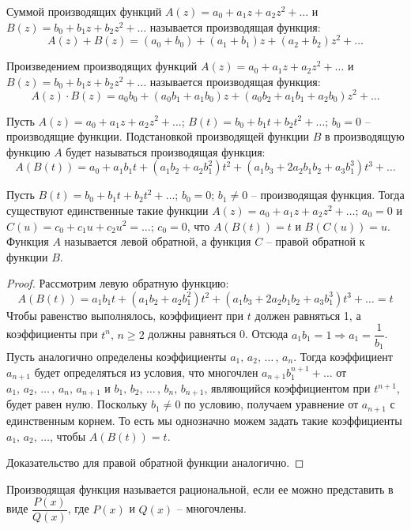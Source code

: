 \documentclass[12pt]{article}
\begin{document}
\begin{definition}
    Суммой производящих функций $A(z)=a_0+a_1z+a_2z^2+\ldots$ и $B(z)=b_0+b_1z+b_2z^2+\ldots$ называется производящая функция:
    $$A(z)+B(z)=(a_0+b_0)+(a_1+b_1)z+(a_2+b_2)z^2+\ldots$$
\end{definition}
\begin{definition}
    Произведением производящих функций $A(z)=a_0+a_1z+a_2z^2+\ldots$ и $B(z)=b_0+b_1z+b_2z^2+\ldots$ называется производящая функция:
    $$A(z)\cdot B(z)=a_0b_0+(a_0b_1+a_1b_0)z+(a_0b_2+a_1b_1+a_2b_0)z^2+\ldots$$
\end{definition}
\begin{definition}
    Пусть $A(z)=a_0+a_1z+a_2z^2+\ldots$; $B(t)=b_0+b_1t+b_2t^2+\ldots;\,b_0=0$ – производящие функции. Подстановкой производящей функции $B$ в производящую функцию $A$ будет называться производящая функция:
    $$A(B(t))=a_0+a_1b_1t+(a_1b_2+a_2b_1^2)t^2+(a_1b_3+2a_2b_1b_2+a_3b_1^3)t^3+\ldots$$
\end{definition}
\begin{theorem}
    Пусть $B(t)=b_0+b_1t+b_2t^2+\ldots;\,b_0=0;\,b_1\neq 0$ – производящая функция. Тогда существуют единственные такие функции $A(z)=a_0+a_1z+a_2z^2+\ldots;\,a_0=0$ и $C(u)=c_0+c_1u+c_2u^2=\ldots;\,c_0=0$, что $A(B(t))=t$ и $B(C(u))=u.$ Функция $A$ называется левой обратной, а функция $C$ – правой обратной к функции $B$.
\end{theorem}
\begin{proof}
    Рассмотрим левую обратную функцию:
    $$A(B(t))=a_1b_1t+(a_1b_2+a_2b_1^2)t^2+(a_1b_3+2a_2b_1b_2+a_3b_1^3)t^3+\ldots=t$$
    Чтобы равенство выполнялось, коэффициент при $t$ должен равняться 1, а коэффициенты при $t^n,\,n\geq 2$ должны равняться 0. Отсюда $a_1b_1=1\Longrightarrow a_1=\dfrac{1}{b_1}$. Пусть аналогично определены коэффициенты $a_1,\,a_2,\,\ldots\,,\,a_n$. Тогда коэффициент $a_{n+1}$ будет определяться из условия, что многочлен $a_{n+1}b^{n+1}_1+\ldots$ от $a_1,\,a_2,\,\ldots\,,\,a_n,\,a_{n+1}$ и $b_1,\,b_2,\,\ldots\,,\,b_n,\,b_{n+1}$, являющийся коэффициентом при $t^{n+1}$, будет равен нулю. Поскольку $b_1\neq 0$ по условию, получаем уравнение от $a_{n+1}$ с единственным корнем. То есть мы однозначно можем задать такие коэффициенты $a_1,\,a_2,\,\ldots$, чтобы $A(B(t))=t$.\bigskip
    
    Доказательство для правой обратной функции аналогично.
\end{proof}
\begin{definition}
    Производящая функция называется рациональной, если ее можно представить в виде $\dfrac{P(x)}{Q(x)}$, где $P(x)$ и $Q(x)$ – многочлены.
\end{definition}
\end{document}
